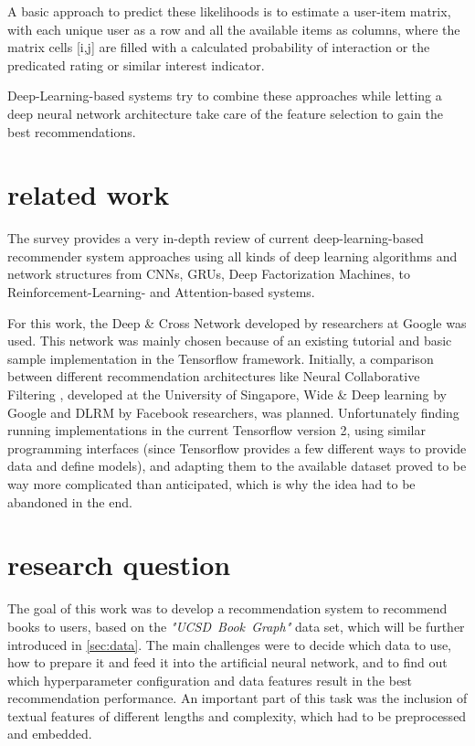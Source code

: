 \documentclass[10pt,final,journal,a4paper,oneside,twocolumn]{IEEEtran}
\begin{document}
A basic approach to predict these likelihoods is to estimate a user-item matrix, with each unique user as a row and all the available items as columns, where the matrix cells [i,j] are filled with a calculated probability of interaction or the predicated rating or similar interest indicator. 

Deep-Learning-based systems try to combine these approaches while letting a deep neural network architecture take care of the feature selection to gain the best recommendations.

\section{related work}
The survey \cite{Zhang.2020} provides a very in-depth review of current deep-learning-based recommender system approaches using all kinds of deep learning algorithms and network structures from CNNs, GRUs, Deep Factorization Machines, to Reinforcement-Learning- and Attention-based systems.

For this work, the Deep \& Cross Network \cite{Wang.2017} \cite{Wang.2021} developed by researchers at Google was used. This network was mainly chosen because of an existing tutorial and basic sample implementation in the Tensorflow framework.
Initially, a comparison between different recommendation architectures like Neural Collaborative Filtering \cite{He.2017}, developed at the University of Singapore, Wide \& Deep learning \cite{Cheng.2016} by Google and DLRM \cite{Naumov.31.05.2019} by Facebook researchers, was planned.
Unfortunately finding running implementations in the current Tensorflow version 2, using similar programming interfaces (since Tensorflow provides a few different ways to provide data and define models), and adapting them to the available dataset proved to be way more complicated than anticipated, which is why the idea had to be abandoned in the end.


\section{research question}
The goal of this work was to develop a recommendation system to recommend books to users, based on the \emph{"UCSD~Book~Graph"} data set, which will be further introduced in \autoref{sec:data}. The main challenges were to decide which data to use, how to prepare it and feed it into the artificial neural network, and to find out which hyperparameter configuration and data features result in the best recommendation performance.
An important part of this task was the inclusion of textual features of different lengths and complexity, which had to be preprocessed and embedded.
\end{document}

